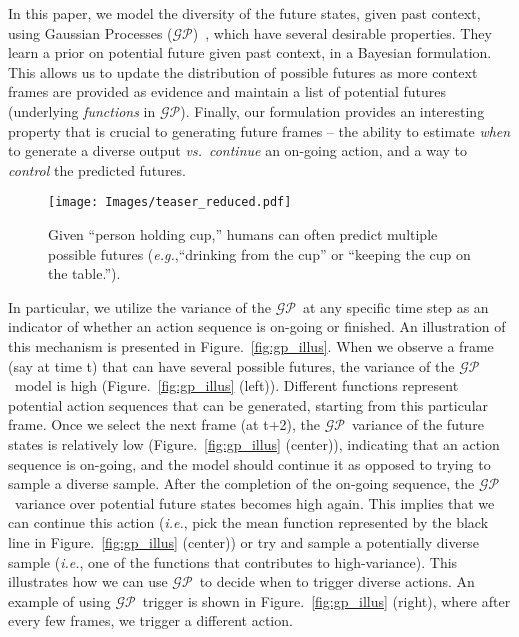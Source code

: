\documentclass{article} \usepackage{iclr2021_conference,times}
\newcommand{\GP}{$\mathcal{GP}$}
\def\eg{\emph{e.g.}}
\def\ie{\emph{i.e.}}
\def\vs{\emph{vs.}}
\begin{document}
In this paper, we model the diversity of the future states, given past context, using Gaussian Processes (\GP)~\citep{Rasmussen06gaussianprocesses}, which have several desirable properties. They learn a prior on potential future given past context, in a Bayesian formulation. This allows us to update the distribution of possible futures as more context frames are provided as evidence and maintain a list of potential futures (underlying \emph{functions} in \GP). Finally, our formulation provides an interesting property that is crucial to generating future frames -- the ability to estimate \emph{when} to generate a diverse output \vs\ \emph{continue} an on-going action, and a way to \emph{control} the predicted futures. 



\begin{figure}
   \centering
    \texttt{[image: Images/teaser\_reduced.pdf]}
    \vspace{-0.2in}
    \caption{Given ``person holding cup,'' humans can often predict multiple possible futures (\eg,``drinking from the cup'' or ``keeping the cup on the table.'').}
    \vspace{-0.15in}
  \label{fig:diverse_illus}
\end{figure} 



In particular, we utilize the variance of the \GP\ at any specific time step as an indicator of whether an action sequence is on-going or finished. An illustration of this mechanism is presented in Figure.~\ref{fig:gp_illus}. When we observe a frame (say at time t) that can have several possible futures, the variance of the \GP\ model is high (Figure.~\ref{fig:gp_illus} (left)). Different functions represent potential action sequences that can be generated, starting from this particular frame. Once we select the next frame (at t+2), the \GP\ variance of the future states is relatively low (Figure.~\ref{fig:gp_illus} (center)), indicating that an action sequence is on-going, and the model should continue it as opposed to trying to sample a diverse sample. After the completion of the on-going sequence, the \GP\ variance over potential future states becomes high again. This implies that we can continue this action (\ie, pick the mean function represented by the black line in Figure.~\ref{fig:gp_illus} (center)) or try and sample a potentially diverse sample (\ie, one of the functions that contributes to high-variance). This illustrates how we can use \GP\ to decide when to trigger diverse actions. An example of using \GP\ trigger is shown in Figure.~\ref{fig:gp_illus} (right), where after every few frames, we trigger a different action.
\end{document}
